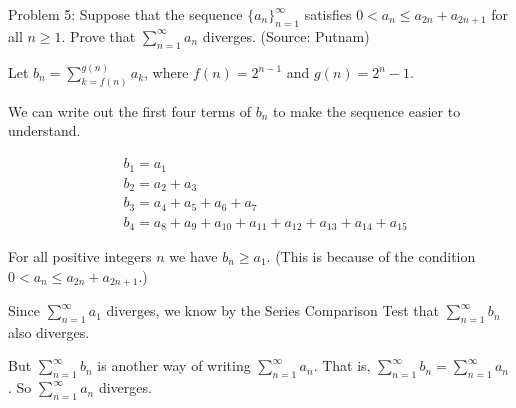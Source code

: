 Problem 5: Suppose that the sequence $\{a_n\}_{n=1}^\infty$ satisfies $0 < a_n \le a_{2n} + a_{2n+1}$ for all $n \ge 1$. Prove that $\displaystyle\sum_{n=1}^\infty a_n$ diverges. (Source: Putnam)

Let $\displaystyle b_n = \sum_{k=f(n)}^{g(n)} a_{k}$, where $f(n) = 2^{n-1}$ and $g(n) = 2^{n}-1$.

We can write out the first four terms of $b_n$ to make the sequence easier to understand.

\begin{align*}
& b_1 = a_1 \\
& b_2 = a_2 + a_3 \\
& b_3 = a_4 + a_5 + a_6 + a_7 \\
& b_4 = a_8 + a_9 + a_{10} + a_{11} + a_{12} + a_{13} + a_{14} + a_{15}
\end{align*}

For all positive integers $n$ we have $b_n \geq a_1$. (This is because of the condition $0 < a_n \leq a_{2n} + a_{2n+1}.$)

Since $\displaystyle \sum_{n=1}^{\infty} a_1$ diverges, we know by the Series Comparison Test that $\displaystyle \sum_{n=1}^{\infty} b_n$ also diverges.

But $\displaystyle \sum_{n=1}^{\infty} b_n$ is another way of writing $\displaystyle \sum_{n=1}^{\infty} a_n$. That is, $\displaystyle \sum_{n=1}^{\infty} b_n = \sum_{n=1}^{\infty} a_n$. So $\displaystyle \sum_{n=1}^{\infty} a_n$ diverges.
